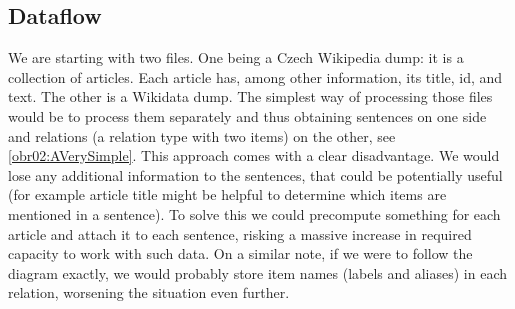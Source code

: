 \subsection{Dataflow}

We are starting with two files. One being a Czech Wikipedia dump: it is a collection of articles. Each article has, among other information, its title, id, and text. The other is a Wikidata dump. The simplest way of processing those files would be to process them separately and thus obtaining sentences on one side and relations (a relation type with two items) on the other, see \ref{obr02:AVerySimple}. This approach comes with a clear disadvantage. We would lose any additional information to the sentences, that could be potentially useful (for example article title might be helpful to determine which items are mentioned in a sentence). To solve this we could precompute something for each article and attach it to each sentence, risking a massive increase in required capacity to work with such data. On a similar note, if we were to follow the diagram exactly, we would probably store item names (labels and aliases) in each relation, worsening the situation even further.

\begin{figure}
\centering
{}
\qquad
{}
\end{figure}



